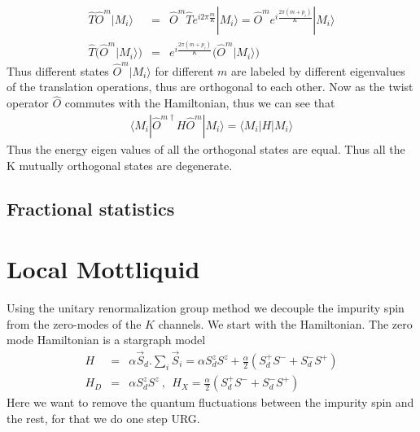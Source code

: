 \documentclass[reprint,prb,superscriptaddress]{revtex4-1}
\begin{document}
\begin{eqnarray}
\hat{T} \hat{O}^m |M_i\rangle &=& \hat{O}^m \hat{T} e^{i2\pi \frac{m}{K}} |M_i\rangle =\hat{O}^m e^{i \frac{2\pi(m+p_i)}{K} } |M_i\rangle \nonumber\\
\hat{T} \bigg(\hat{O}^m |M_i\rangle \bigg) &=&  e^{i \frac{2\pi(m+p_i)}{K} } \bigg( \hat{O}^m |M_i\rangle \bigg)
\end{eqnarray}
Thus different states $ \hat{O}^m |M_i\rangle$ for different $m$ are labeled by different eigenvalues of the translation operations, thus are orthogonal to each other. Now as the twist operator $\hat{O}$ commutes with the Hamiltonian, thus we can see that 
\begin{eqnarray}
\langle M_i| \hat{O}^{m \dagger}  H \hat{O}^m |M_i\rangle =\langle M_i|  H |M_i\rangle 
\end{eqnarray}
Thus the energy eigen values of all the orthogonal states are equal. Thus all the K mutually orthogonal states are degenerate.


\subsection{Fractional statistics}




\section{Local Mottliquid}


\noindent Using the unitary renormalization group method we decouple the impurity spin from the zero-modes of the $K$ channels. We start with the Hamiltonian. The zero mode Hamiltonian is a stargraph model 
\begin{eqnarray}
H &=& \alpha \vec{S}_d.\displaystyle\sum_i \vec{S}_i =\alpha S_d^zS^z + \frac{\alpha}{2} (S_d^+S^-+ S_d^-S^+) \nonumber\\
H_D &=& \alpha S^z_d S^z~,~~ H_X = \frac{\alpha}{2} (S_d^+S^-+ S_d^-S^+)
\end{eqnarray}
Here we want to remove the quantum fluctuations between the impurity spin and the rest, for that we do one step URG.
\end{document}
